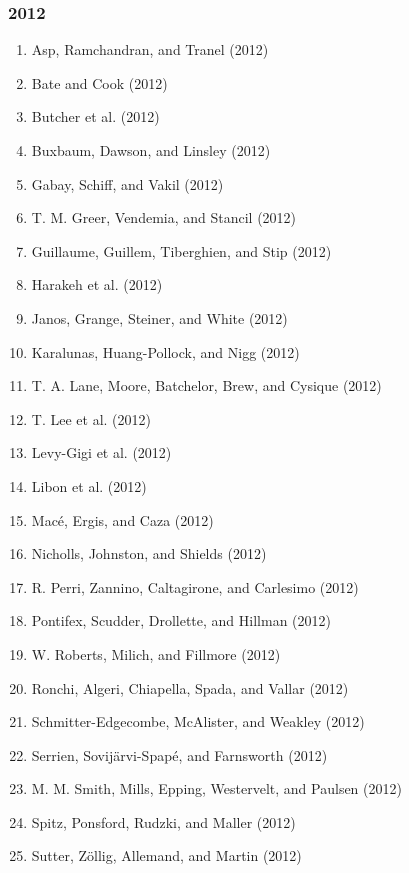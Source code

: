 \documentclass[english,man]{apa6}
\providecommand{\tightlist}{%
  \setlength{\itemsep}{0pt}\setlength{\parskip}{0pt}}
\theoremstyle{definition}
\theoremstyle{definition}
\theoremstyle{definition}
\theoremstyle{remark}
\begin{document}
\subsubsection{2012}\label{section-38}

\begin{enumerate}
\def\labelenumi{\arabic{enumi})}
\tightlist
\item
  Asp, Ramchandran, and Tranel (2012)
\item
  Bate and Cook (2012)
\item
  Butcher et al. (2012)
\item
  Buxbaum, Dawson, and Linsley (2012)
\item
  Gabay, Schiff, and Vakil (2012)
\item
  T. M. Greer, Vendemia, and Stancil (2012)
\item
  Guillaume, Guillem, Tiberghien, and Stip (2012)
\item
  Harakeh et al. (2012)
\item
  Janos, Grange, Steiner, and White (2012)
\item
  Karalunas, Huang-Pollock, and Nigg (2012)
\item
  T. A. Lane, Moore, Batchelor, Brew, and Cysique (2012)
\item
  T. Lee et al. (2012)
\item
  Levy-Gigi et al. (2012)
\item
  Libon et al. (2012)
\item
  Macé, Ergis, and Caza (2012)
\item
  Nicholls, Johnston, and Shields (2012)
\item
  R. Perri, Zannino, Caltagirone, and Carlesimo (2012)
\item
  Pontifex, Scudder, Drollette, and Hillman (2012)
\item
  W. Roberts, Milich, and Fillmore (2012)
\item
  Ronchi, Algeri, Chiapella, Spada, and Vallar (2012)
\item
  Schmitter-Edgecombe, McAlister, and Weakley (2012)
\item
  Serrien, Sovijärvi-Spapé, and Farnsworth (2012)
\item
  M. M. Smith, Mills, Epping, Westervelt, and Paulsen (2012)
\item
  Spitz, Ponsford, Rudzki, and Maller (2012)
\item
  Sutter, Zöllig, Allemand, and Martin (2012)
\end{enumerate}
\end{document}

